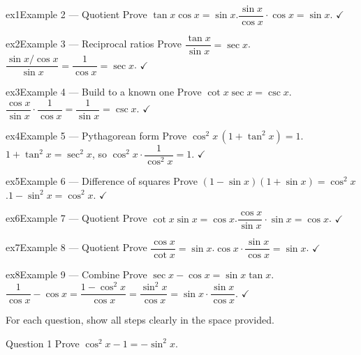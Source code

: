 \documentclass[11pt]{article}
\begin{document}
\begin{example}{ex1}{Example 2 --- Quotient}
Prove $\tan x\cos x=\sin x$.\soln $\dfrac{\sin x}{\cos x}\cdot\cos x=\sin x$. $\checkmark$
\end{example}

\begin{example}{ex2}{Example 3 --- Reciprocal ratios}
Prove $\dfrac{\tan x}{\sin x}=\sec x$.\soln $\dfrac{\sin x/\cos x}{\sin x}=\dfrac1{\cos x}=\sec x$. $\checkmark$
\end{example}

\begin{example}{ex3}{Example 4 --- Build to a known one}
Prove $\cot x\sec x=\csc x$.\soln $\dfrac{\cos x}{\sin x}\cdot\dfrac1{\cos x}=\dfrac1{\sin x}=\csc x$. $\checkmark$
\end{example}

\begin{example}{ex4}{Example 5 --- Pythagorean form}
Prove $\cos^2 x\,(1+\tan^2 x)=1$.\soln $1+\tan^2 x=\sec^2 x$, so $\cos^2 x\cdot\dfrac1{\cos^2 x}=1$. $\checkmark$
\end{example}

\begin{example}{ex5}{Example 6 --- Difference of squares}
Prove $(1-\sin x)(1+\sin x)=\cos^2 x$.\soln $1-\sin^2 x=\cos^2 x$. $\checkmark$
\end{example}

\begin{example}{ex6}{Example 7 --- Quotient}
Prove $\cot x\sin x=\cos x$.\soln $\dfrac{\cos x}{\sin x}\cdot\sin x=\cos x$. $\checkmark$
\end{example}

\begin{example}{ex7}{Example 8 --- Quotient}
Prove $\dfrac{\cos x}{\cot x}=\sin x$.\soln $\cos x\cdot\dfrac{\sin x}{\cos x}=\sin x$. $\checkmark$
\end{example}

\begin{example}{ex8}{Example 9 --- Combine}
Prove $\sec x-\cos x=\sin x\tan x$.\soln $\dfrac1{\cos x}-\cos x=\dfrac{1-\cos^2 x}{\cos x}=\dfrac{\sin^2 x}{\cos x}=\sin x\cdot\dfrac{\sin x}{\cos x}$. $\checkmark$
\end{example}

\clearpage
{}
For each question, show all steps clearly in the space provided.

\begin{qbox}{Question 1}
Prove $\cos^2 x-1=-\sin^2 x$.\workspace{2.4cm}
\end{qbox}
\end{document}
